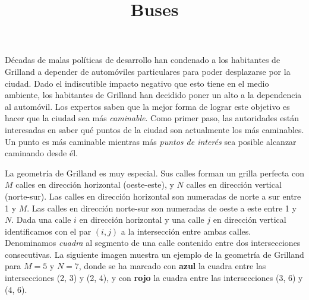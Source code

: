 \documentclass{oci}
\title{Buses}
\begin{document}
\begin{problemDescription}
  Décadas de malas políticas de desarrollo han condenado a los habitantes de Grilland a depender
  de automóviles particulares para poder desplazarse por la ciudad.
  Dado el indiscutible impacto negativo que esto tiene en el medio ambiente, los habitantes de
  Grilland han decidido poner un alto a la dependencia al automóvil.
  Los expertos saben que la mejor forma de lograr este objetivo es hacer que la ciudad sea más
  \emph{caminable}.
  Como primer paso, las autoridades están interesadas en saber qué puntos de la ciudad son
  actualmente los más caminables.
  Un punto es más caminable mientras más \emph{puntos de interés} sea posible alcanzar caminando
  desde él.

  La geometría de Grilland es muy especial.
  Sus calles forman un grilla perfecta con $M$ calles en dirección horizontal (oeste-este),
  y $N$ calles en dirección vertical (norte-sur).
  Las calles en dirección horizontal son numeradas de norte a sur entre 1 y $M$.
  Las calles en dirección norte-sur son numeradas de oeste a este entre 1 y $N$.
  Dada una calle $i$ en dirección horizontal y una calle $j$ en dirección vertical identificamos
  con el par $(i, j)$ a la intersección entre ambas calles.
  Denominamos \emph{cuadra} al segmento de una calle contenido entre dos intersecciones consecutivas.
  La siguiente imagen muestra un ejemplo de la geometría de Grilland para $M=5$ y $N=7$, donde se
  ha marcado con {\bf\color{blue}azul} la cuadra entre las intersecciones (2, 3) y (2, 4), y con
  {\bf\color{red}rojo} la cuadra entre las intersecciones (3, 6) y (4, 6).


  \begin{center}
  \end{center}


\end{problemDescription}
\end{document}
